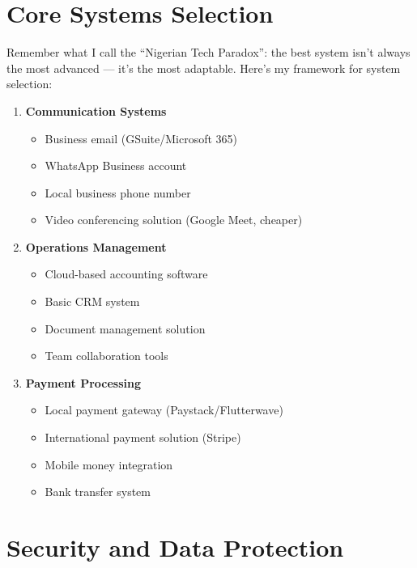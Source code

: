 \section{Core Systems Selection}\label{sec:core-systems}

Remember what I call the ``Nigerian Tech Paradox'': the best system isn't always the most advanced --- it's the most adaptable. Here's my framework for system selection:

\begin{tcolorbox}[colback=white,colframe=primarydark,title=\textbf{Essential Systems Framework}]
\begin{enumerate}
    \item \textbf{Communication Systems}
    \begin{itemize}
        \item Business email (GSuite/Microsoft 365)
        \item WhatsApp Business account
        \item Local business phone number
        \item Video conferencing solution (Google Meet, cheaper)
    \end{itemize}

    \item \textbf{Operations Management}
    \begin{itemize}
        \item Cloud-based accounting software
        \item Basic CRM system
        \item Document management solution
        \item Team collaboration tools
    \end{itemize}

    \item \textbf{Payment Processing}
    \begin{itemize}
        \item Local payment gateway (Paystack/Flutterwave)
        \item International payment solution (Stripe)
        \item Mobile money integration
        \item Bank transfer system
    \end{itemize}
\end{enumerate}
\end{tcolorbox}

\section{Security and Data Protection}\label{sec:security-data}

